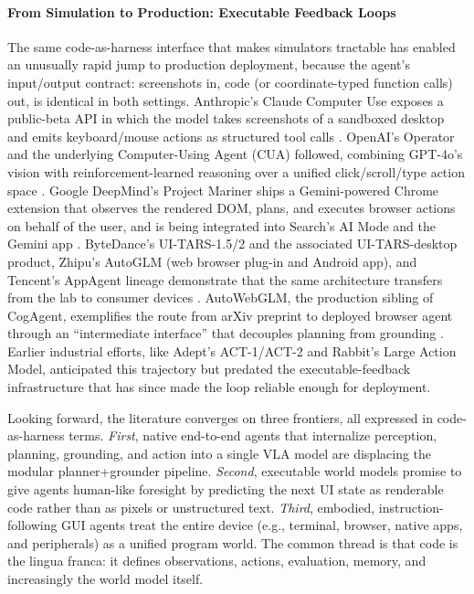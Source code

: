 \documentclass{llmxive}
\begin{document}
\paragraph{From Simulation to Production: Executable Feedback Loops}

The same code-as-harness interface that makes simulators tractable has enabled an unusually rapid jump to production deployment, because the agent's input/output contract: screenshots in, code (or coordinate-typed function calls) out, is identical in both settings. Anthropic's Claude Computer Use exposes a public-beta API in which the model takes screenshots of a sandboxed desktop and emits keyboard/mouse actions as structured tool calls \citep{anthropic2024computeruse}. OpenAI's Operator and the underlying Computer-Using Agent (CUA) followed, combining GPT-4o's vision with reinforcement-learned reasoning over a unified click/scroll/type action space \citep{openai2025operator}. Google DeepMind's Project Mariner ships a Gemini-powered Chrome extension that observes the rendered DOM, plans, and executes browser actions on behalf of the user, and is being integrated into Search's AI Mode and the Gemini app \citep{deepmind2025mariner}. ByteDance's UI-TARS-1.5/2 and the associated UI-TARS-desktop product, Zhipu's AutoGLM (web browser plug-in and Android app), and Tencent's AppAgent lineage demonstrate that the same architecture transfers from the lab to consumer devices \citep{qin2025uitarspioneeringautomatedgui,liu2024autoglmautonomousfoundationagents,zhang2023appagentmultimodalagentssmartphone}. AutoWebGLM, the production sibling of CogAgent, exemplifies the route from arXiv preprint to deployed browser agent through an ``intermediate interface'' that decouples planning from grounding \citep{lai2024autowebglmlargelanguagemodelbased}. Earlier industrial efforts, like Adept's ACT-1/ACT-2 and Rabbit's Large Action Model, anticipated this trajectory but predated the executable-feedback infrastructure that has since made the loop reliable enough for deployment.

Looking forward, the literature converges on three frontiers, all expressed in code-as-harness terms. \textit{First}, native end-to-end agents that internalize perception, planning, grounding, and action into a single VLA model are displacing the modular planner+grounder pipeline. \textit{Second}, executable world models promise to give agents human-like foresight by predicting the next UI state as renderable code rather than as pixels or unstructured text. \textit{Third}, embodied, instruction-following GUI agents treat the entire device (e.g., terminal, browser, native apps, and peripherals) as a unified program world. The common thread is that code is the lingua franca: it defines observations, actions, evaluation, memory, and increasingly the world model itself.
\end{document}
